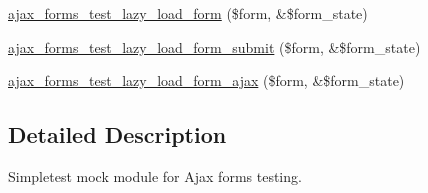 \begin{DoxyCompactItemize}
\item 
\hyperlink{ajax__forms__test_8module_a15e98e8d679461185f6a9f6983a3322d}{ajax\_\-forms\_\-test\_\-lazy\_\-load\_\-form} (\$form, \&\$form\_\-state)
\item 
\hyperlink{ajax__forms__test_8module_a58fcf2df136929f4d0a22a7616ef8824}{ajax\_\-forms\_\-test\_\-lazy\_\-load\_\-form\_\-submit} (\$form, \&\$form\_\-state)
\item 
\hyperlink{ajax__forms__test_8module_a7ecee9a8051e98114f55ff1449126cb6}{ajax\_\-forms\_\-test\_\-lazy\_\-load\_\-form\_\-ajax} (\$form, \&\$form\_\-state)
\end{DoxyCompactItemize}


\subsection{Detailed Description}
Simpletest mock module for Ajax forms testing. 

